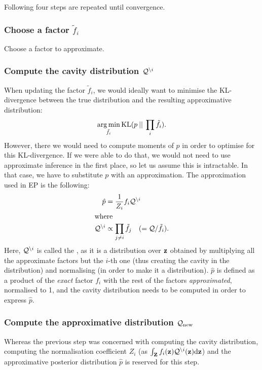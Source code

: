 \documentclass[11pt]{article}
\begin{document}
Following four steps are repeated until convergence.

\subsubsection[Choose a factor]{Choose a factor $\tilde{f}_i$}
Choose a factor to approximate.

\subsubsection[Compute the cavity distribution]{Compute the cavity 
	distribution $\mathcal{Q}^{\setminus i}$}
When updating the factor $\tilde{f}_i$, we would ideally want to minimise 
the KL-divergence between the true distribution and the resulting 
approximative distribution:
\begin{equation}
	\operatorname*{arg\,min}_{\tilde{f}_i}\text{KL}(p\:||\:\prod_i{\tilde{f}_i}).
\end{equation}
However, there we would need to compute moments of $p$ in order to optimise 
for this KL-divergence. If we were able to do that, we would not need to 
use approximate inference in the first place, so let us assume this is 
intractable. In that case, we have to substitute $p$ with an approximation.  
The approximation used in EP is the following:
\begin{align}
	\hat{p} &= \frac{1}{Z_i}f_i\mathcal{Q}^{\setminus i} \label{eq:phat}\\
\intertext{where}
	\mathcal{Q}^{\setminus i} &\propto \prod_{j \not= i}\tilde{f}_j
		\hspace{1em}(= \mathcal{Q} / \tilde{f}_i).
	\label{eq:cavity}
\end{align}
Here, $\mathcal{Q}^{\setminus i}$ is called the , as it
is a distribution over $\mathbf{z}$ obtained by multiplying all the 
approximate factors but the $i$-th one (thus creating the cavity in the 
distribution) and normalising (in order to make it a distribution).  
$\hat{p}$ is defined as a product of the \emph{exact} factor $f_i$ with the 
rest of the factors \emph{approximated}, normalised to 1, and the cavity 
distribution needs to be computed in order to express $\hat{p}$.

\subsubsection[Compute the approximative distribution]{Compute the 
	approximative distribution $\mathcal{Q}_{\text{new}}$}
Whereas the previous step was concerned with computing the cavity 
distribution, computing the normalisation coefficient $Z_i$ (as 
$\int_{\mathbf{Z}} f_i(\mathbf{z})\mathcal{Q}^{\setminus i}(\mathbf{z})\mathrm{d}\mathbf{z}$) and 
the approximative posterior distribution $\hat{p}$ is reserved for this 
step.
\end{document}
